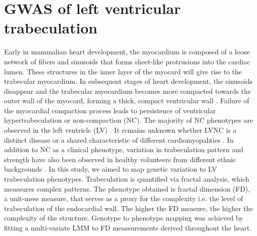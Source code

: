\chapter{GWAS of left ventricular trabeculation}
\label{chapter:FD}
Early in mammalian heart development, the myocardium is composed of a loose network of fibers and sinusoids that forms sheet-like protrusions into the cardiac lumen. These structures in the inner layer of the myocard will give rise to the trabecular myocardium. In subsequent stages of heart development, the sinusoids disappear and the trabecular myocardium becomes more compacted towards the outer wall of the myocard, forming a thick, compact ventricular wall \citep{Chen2009,Yousef2009}. Failure of the myocardial compaction process leads to persistence of ventricular hypertrabeculation or non-compaction (NC). The majority of NC phenotypes are observed in the left ventricle (LV) \citep{Zambrano2002}. It remains unknown whether LVNC is a distinct disease or a shared characteristic of different cardiomyopahties \citep{Captur2013}. In addition to NC as a clinical phenotype, variation in trabeculation pattern and strength have also been observed in healthy volunteers from different ethnic backgrounds \citep{Kawel2012,Captur2015}. In this study, we aimed to map genetic variation to LV trabeculation phenotypes. Trabeculation is quantified via fractal analysis, which meassures complex patterns. The phenotype obtained is fractal dimension (FD), a unit-mess measure, that serves as a proxy for the complexity i.e. the level of trabeculation of the endocardial wall. The higher the FD measure, the higher the complexity  of the structure. Genotype to phenotype mapping was achieved by fitting a multi-variate LMM to FD meassurements derived throughout the heart.


